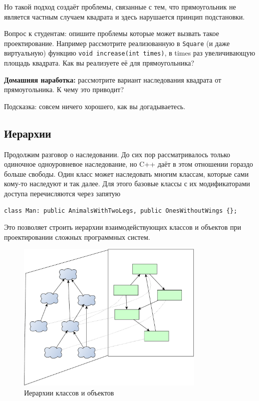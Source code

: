 \documentclass[a4paper,12pt,oneside]{article}
\begin{document}


Но такой подход создаёт проблемы, связанные с тем, что прямоугольник не является частным случаем квадрата и здесь нарушается принцип подстановки. 

Вопрос к студентам: опишите проблемы которые может вызвать такое проектирование. Например рассмотрите реализованную в \lstinline!Square! (и даже виртуальную) функцию \lstinline!void increase(int times)!, в times раз увеличивающую площадь квадрата. Как вы реализуете её для прямоугольника?

\textbf{Домашняя наработка:} рассмотрите вариант наследования квадрата от прямоугольника. К чему это приводит?

Подсказка: совсем ничего хорошего, как вы догадываетесь.

\subsection{Иерархии}

Продолжим разговор о наследовании. До сих пор рассматривалось только одиночное одноуровневое наследование, но C++ даёт в этом отношении гораздо больше свободы. Один класс может наследовать многим классам, которые сами кому-то наследуют и так далее. Для этого базовые классы с их модификаторами доступа перечисляются через запятую

\begin{lstlisting}
class Man: public AnimalsWithTwoLegs, public OnesWithoutWings {};
\end{lstlisting}

Это позволяет строить иерархии взаимодействующих классов и объектов при проектировании сложных программных систем.

\begin{figure}[h!]
\centering
\includegraphics[width=0.8\textwidth]{illustrations/hierarchies-crop.pdf}
\caption{Иерархии классов и объектов}
\label{fig:hierarchies-crop}
\end{figure}
\end{document}
